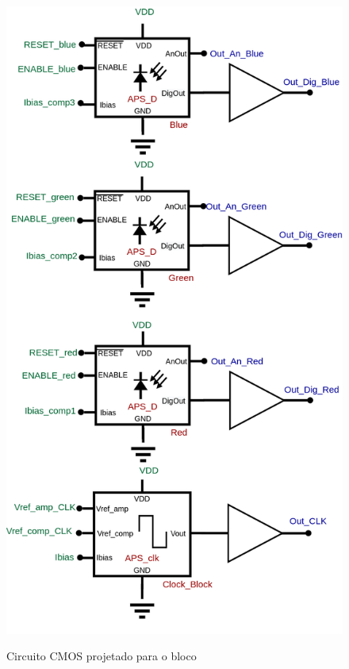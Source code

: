 \begin{figure}[!h]
 \centering
    \centering
    \caption{Circuito CMOS projetado para o bloco \NomeBloco} 
    \includegraphics[scale=0.3]{Circuitos/APS_3.png}
    \label{\NomePFig}
\end{figure}